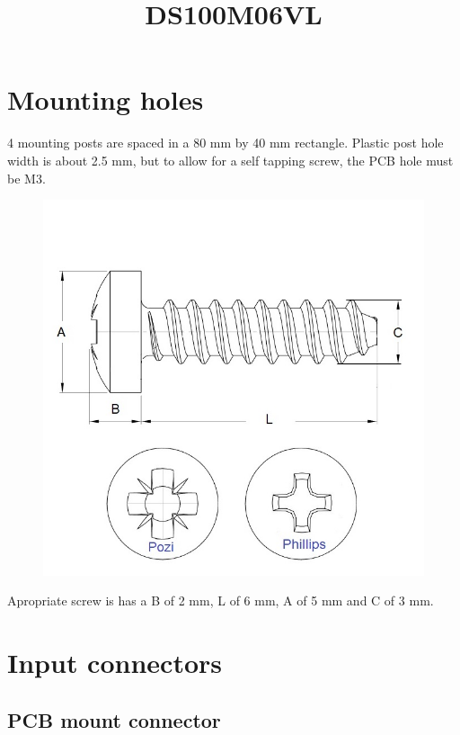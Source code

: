 \documentclass[11pt]{article}
\title{DS100M06VL}
\begin{document}
\maketitle
\pagebreak
\tableofcontents
\pagebreak

\section{Mounting holes}
4 mounting posts are spaced in a 80 mm by 40 mm rectangle. Plastic post 
hole width is about 2.5 mm, but to allow for a self tapping screw, the PCB 
hole must be M3.

\begin{figure}[H]
  \centering 
  \includegraphics[scale=0.4]{"./figs/screw_sizez.jpg"}
\end{figure}

Apropriate screw is has a B of 2 mm, L of 6 mm, A of 5 mm and C of 3 mm. 

\section{Input connectors}

\subsection{PCB mount connector}
\end{document}
